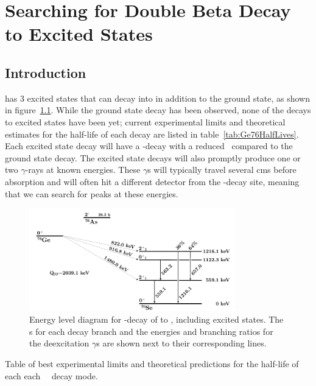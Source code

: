 \documentclass[/main.tex]{subfiles}
\begin{document}
\onlyinsubfile{\textpages}
\chapter{Searching for Double Beta Decay to Excited States}

\section{Introduction}

 has 3 excited states that  can decay into in addition to the ground state, as shown in figure~\ref{fig:Ge76BBLevelDiagram}.
While the ground state decay has been observed, none of the decays to excited states have been yet; current experimental limits and theoretical estimates for the half-life of each decay are listed in table~\ref{tab:Ge76HalfLives}.
Each excited state decay will have a \bb -decay with a reduced \Qval\ compared to the ground state decay.
The excited state decays will also promptly produce one or two $\gamma$-rays at known energies.
These $\gamma$s will typically travel several cms before absorption and will often hit a different detector from the \bb -decay site, meaning that we can search for peaks at these energies.
\\
\begin{figure}[h]
  \centering
  \includegraphics[width=0.8\textwidth]{leveldiagram}
  \caption[Energy level diagram for  \bb to ]{\label{fig:Ge76BBLevelDiagram}
    Energy level diagram for \bb-decay of  to , including excited states. The \Qval s for each decay branch and the energies and branching ratios for the deexcitation $\gamma$s are shown next to their corresponding lines.}
\end{figure}

\begin{table}[p]
  \caption[Current half-live limits and predictions for all \tnbb-decay modes of ]{\label{tab:Ge76HalfLives}
    Table of best experimental limits and theoretical predictions for the half-life of each each \ \bbes\ decay mode.
  }
  
\end{table}
\end{document}
